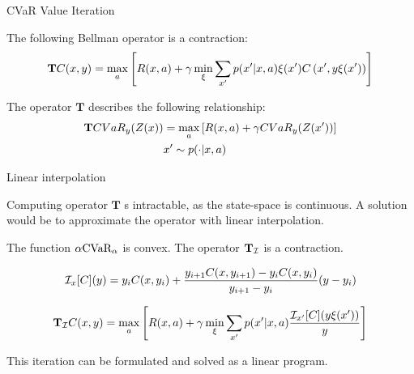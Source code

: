 \documentclass{beamer}
\begin{document}

\begin{frame}{CVaR Value Iteration}

\begin{theorem}
The following Bellman operator is a contraction:
$$\mathbf{T}C(x, y) = \max_a \left[ { R(x, a) + \gamma \min_{\xi} \sum_{x'} p(x'| x, a)\xi(x') C\left( {x', y\xi(x')} \right)} \right]$$
\end{theorem}

\vspace{1cm}

The operator $\mathbf{T}$ describes the following relationship:
\begin{equation*}
\begin{split}
\mathbf{T} CVaR_y(Z(x))&=\max_a \left[ {R(x, a) + \gamma CVaR_{y}(Z(x'))} \right]\\
&x' \sim p(\cdot|x, a)
\end{split}
\end{equation*}

\end{frame}


\begin{frame}{Linear interpolation}

Computing operator $\mathbf{T}$ s intractable, as the state-space is continuous. A solution would be to approximate the operator with linear interpolation.

\begin{theorem}
The function $\alpha\text{CVaR}_\alpha$ is convex. The operator $\mathbf{T}_{\mathcal{I}}$ is a contraction.

$$\mathcal{I}_{x}[C](y)=y_iC(x,y_{i})+\frac{y_{i+1}C(x,y_{i+1})-y_iC(x,y_{i})}{y_{i+1}-y_i}(y-y_i)$$

$$\mathbf{T}_{\mathcal{I}} C(x, y) = \max_a \left[ { R(x, a) + \gamma \min_{\xi} \sum_{x'} p(x'| x, a)\dfrac{\mathcal{I}_{x'} [C](y\xi(x'))}{y}} \right]$$

\end{theorem}

This iteration can be formulated and solved as a linear program.

\end{frame}

\end{document}
